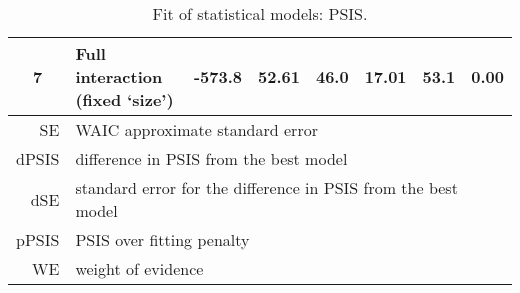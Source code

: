 \begin{table}[h!]
\begin{tabular}{|c|lcccccc|}
		\rowcolor{gray}
		7 & Full interaction (fixed `size') & -573.8 & 52.61 & 46.0 & 17.01 & 53.1 & 0.00 \\
		\hline\hline
		\multicolumn{1}{|r|}{\small SE} & \multicolumn{7}{l|}{\small WAIC approximate standard error} \\
		\multicolumn{1}{|r|}{\small dPSIS} & \multicolumn{7}{l|}{\small difference in PSIS from the best model} \\
		\multicolumn{1}{|r|}{\small dSE} & \multicolumn{7}{l|}{\small standard error for the difference in PSIS from the best model} \\
		\multicolumn{1}{|r|}{\small pPSIS} & \multicolumn{7}{l|}{\small PSIS over fitting penalty} \\
		\multicolumn{1}{|r|}{\small WE} & \multicolumn{7}{l|}{\small weight of evidence} \\
		\hline
	\end{tabular}
	\caption[Fit of statistical models: PSIS]{Fit of statistical models: PSIS.}
	\label{tab:PSIS}
\end{table}
%
%
